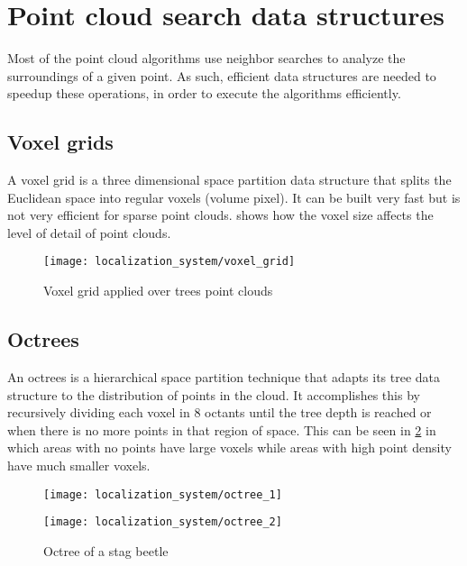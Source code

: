 \section{Point cloud search data structures}

Most of the point cloud algorithms use neighbor searches to analyze the surroundings of a given point. As such, efficient data structures are needed to speedup these operations, in order to execute the algorithms efficiently.


\subsection{Voxel grids}

A voxel grid is a three dimensional space partition data structure that splits the Euclidean space into regular voxels (volume pixel). It can be built very fast but is not very efficient for sparse point clouds.  shows how the voxel size affects the level of detail of point clouds.

\begin{figure}[H]
	\centering
	\texttt{[image: localization\_system/voxel\_grid]}
	\caption[Voxel grid applied over trees point clouds]{Voxel grid applied over trees point clouds \cite{Wu2013}}
	\label{fig:point-cloud-algorithms_voxel-grid}
\end{figure}



\subsection{Octrees}

An octrees is a hierarchical space partition technique that adapts its tree data structure to the distribution of points in the cloud. It accomplishes this by recursively dividing each voxel in 8 octants until the tree depth is reached or when there is no more points in that region of space. This can be seen in \cref{fig:point-cloud-algorithms_octree} in which areas with no points have large voxels while areas with high point density have much smaller voxels.

\begin{figure}[H]
	\centering
	\begin{minipage}[h]{.495\textwidth}
		\centering
		\texttt{[image: localization\_system/octree\_1]}
	\end{minipage}\hfill
	\begin{minipage}[h]{.495\textwidth}
		\centering
		\texttt{[image: localization\_system/octree\_2]}
	\end{minipage}
	\caption[Octree of a stag beetle]{Octree of a stag beetle\protect\footnotemark}
	\label{fig:point-cloud-algorithms_octree}
\end{figure}



